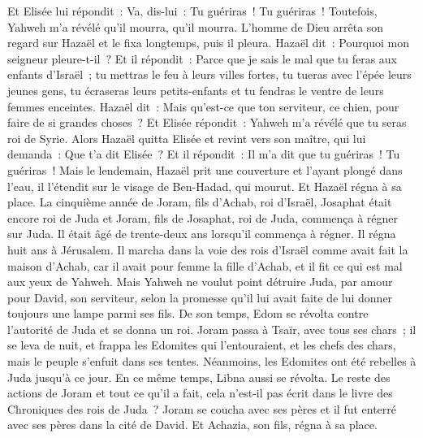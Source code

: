 \begin{multicols}{2}
Et Elisée lui répondit~: Va, dis-lui~: Tu guériras~! Tu guériras~! Toutefois, Yahweh m'a révélé qu'il mourra, qu'il mourra.
L'homme de Dieu arrêta son regard sur Hazaël et le fixa longtemps, puis il pleura.
Hazaël dit~: Pourquoi mon seigneur pleure-t-il~? Et il répondit~: Parce que je sais le mal que tu feras aux enfants d'Israël~; tu mettras le feu à leurs villes fortes, tu tueras avec l'épée leurs jeunes gens, tu écraseras leurs petits-enfants et tu fendras le ventre de leurs femmes enceintes.
Hazaël dit~: Mais qu'est-ce que ton serviteur, ce chien, pour faire de si grandes choses~? Et Elisée répondit~: Yahweh m'a révélé que tu seras roi de Syrie.
Alors Hazaël quitta Elisée et revint vers son maître, qui lui demanda~: Que t'a dit Elisée~? Et il répondit~: Il m'a dit que tu guériras~! Tu guériras~!
Mais le lendemain, Hazaël prit une couverture et l'ayant plongé dans l'eau, il l'étendit sur le visage de Ben-Hadad, qui mourut. Et Hazaël régna à sa place.
La cinquième année de Joram, fils d'Achab, roi d'Israël, Josaphat était encore roi de Juda et Joram, fils de Josaphat, roi de Juda, commença à régner sur Juda.
Il était âgé de trente-deux ans lorsqu'il commença à régner. Il régna huit ans à Jérusalem.
Il marcha dans la voie des rois d'Israël comme avait fait la maison d'Achab, car il avait pour femme la fille d'Achab, et il fit ce qui est mal aux yeux de Yahweh.
Mais Yahweh ne voulut point détruire Juda, par amour pour David, son serviteur, selon la promesse qu'il lui avait faite de lui donner toujours une lampe parmi ses fils.
De son temps, Edom se révolta contre l'autorité de Juda et se donna un roi.
Joram passa à Tsaïr, avec tous ses chars~; il se leva de nuit, et frappa les Edomites qui l'entouraient, et les chefs des chars, mais le peuple s'enfuit dans ses tentes.
Néanmoins, les Edomites ont été rebelles à Juda jusqu'à ce jour. En ce même temps, Libna aussi se révolta.
Le reste des actions de Joram et tout ce qu'il a fait, cela n'est-il pas écrit dans le livre des Chroniques des rois de Juda~?
Joram se coucha avec ses pères et il fut enterré avec ses pères dans la cité de David. Et Achazia, son fils, régna à sa place.

\end{multicols}
